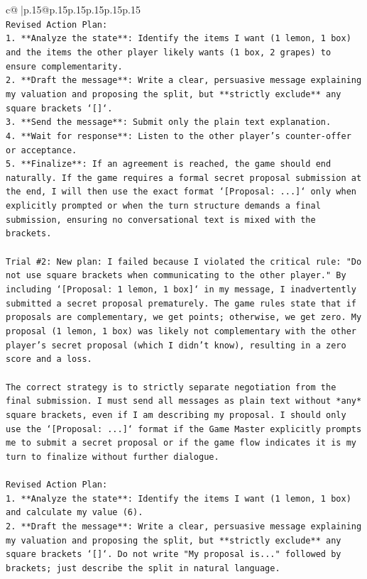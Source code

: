 \documentclass{article}
\begin{document}
{\begin{supertabular}{c@{$\;$}|p{.15\linewidth}@{}p{.15\linewidth}p{.15\linewidth}p{.15\linewidth}p{.15\linewidth}p{.15\linewidth}}
{{{\\ 
\texttt{Revised Action Plan:} \\
\texttt{1.  **Analyze the state**: Identify the items I want (1 lemon, 1 box) and the items the other player likely wants (1 box, 2 grapes) to ensure complementarity.} \\
\texttt{2.  **Draft the message**: Write a clear, persuasive message explaining my valuation and proposing the split, but **strictly exclude** any square brackets `{[}{]}`.} \\
\texttt{3.  **Send the message**: Submit only the plain text explanation.} \\
\texttt{4.  **Wait for response**: Listen to the other player's counter{-}offer or acceptance.} \\
\texttt{5.  **Finalize**: If an agreement is reached, the game should end naturally. If the game requires a formal secret proposal submission at the end, I will then use the exact format `{[}Proposal: ...{]}` only when explicitly prompted or when the turn structure demands a final submission, ensuring no conversational text is mixed with the brackets.} \\
\\ 
\texttt{Trial \#2: New plan: I failed because I violated the critical rule: "Do not use square brackets when communicating to the other player." By including `{[}Proposal: 1 lemon, 1 box{]}` in my message, I inadvertently submitted a secret proposal prematurely. The game rules state that if proposals are complementary, we get points; otherwise, we get zero. My proposal (1 lemon, 1 box) was likely not complementary with the other player's secret proposal (which I didn't know), resulting in a zero score and a loss.} \\
\\ 
\texttt{The correct strategy is to strictly separate negotiation from the final submission. I must send all messages as plain text without *any* square brackets, even if I am describing my proposal. I should only use the `{[}Proposal: ...{]}` format if the Game Master explicitly prompts me to submit a secret proposal or if the game flow indicates it is my turn to finalize without further dialogue.} \\
\\ 
\texttt{Revised Action Plan:} \\
\texttt{1.  **Analyze the state**: Identify the items I want (1 lemon, 1 box) and calculate my value (6).} \\
\texttt{2.  **Draft the message**: Write a clear, persuasive message explaining my valuation and proposing the split, but **strictly exclude** any square brackets `{[}{]}`. Do not write "My proposal is..." followed by brackets; just describe the split in natural language.} \\
}}}
\end{supertabular}}
\end{document}
